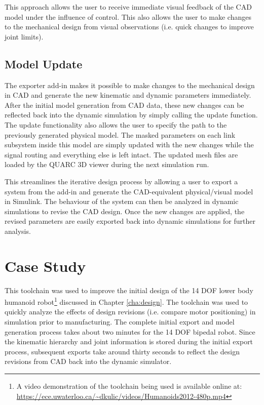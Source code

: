 This approach allows the user to receive immediate visual feedback of the CAD model under the influence of control. This also allows the user to make changes to the mechanical design from visual observations (i.e. quick changes to improve joint limits).

\subsection{Model Update} %
\label{sub:model_update}
The exporter add-in makes it possible to make changes to the mechanical design in CAD and generate the new kinematic and dynamic parameters immediately. After the initial model generation from CAD data, these new changes can be reflected back into the dynamic simulation by simply calling the update function. The update functionality also allows the user to specify the path to the previously generated physical model. The masked parameters on each link subsystem inside this model are simply updated with the new changes while the signal routing and everything else is left intact. The updated mesh files are loaded by the QUARC 3D viewer during the next simulation run.

This streamlines the iterative design process by allowing a user to export a system from the add-in and generate the CAD-equivalent physical/visual model in Simulink. The behaviour of the system can then be analyzed in dynamic simulations to revise the CAD design. Once the new changes are applied, the revised parameters are easily exported back into dynamic simulations for further analysis.


\section{Case Study} %
\label{sec:case_study}

This toolchain was used to improve the initial design of the 14 DOF lower body humanoid robot\footnote{A video demonstration of the toolchain being used is available online at: \\ \url{https://ece.uwaterloo.ca/~dkulic/videos/Humanoids2012-480p.mp4}} discussed in Chapter \ref{cha:design}. The toolchain was used to quickly analyze the effects of design revisions (i.e. compare motor positioning) in simulation prior to manufacturing. The complete initial export and model generation process takes about two minutes for the 14 DOF bipedal robot. Since the kinematic hierarchy and joint information is stored during the initial export process, subsequent exports take around thirty seconds to reflect the design revisions from CAD back into the dynamic simulator. 

